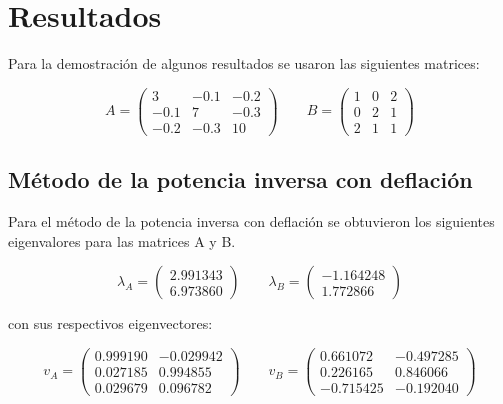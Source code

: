 \section{Resultados}

Para la demostración de algunos resultados se usaron las siguientes matrices:

\begin{equation}
    A = \begin{pmatrix}
        3    & -0.1 & -0.2 \\
        -0.1 & 7    & -0.3 \\
        -0.2 & -0.3 & 10
    \end{pmatrix}
    \qquad
    B = \begin{pmatrix}
        1 & 0 & 2 \\
        0 & 2 & 1 \\
        2 & 1 & 1
    \end{pmatrix}
\end{equation}
\subsection{Método de la potencia inversa con deflación}

Para el método de la potencia inversa con deflación se obtuvieron los siguientes eigenvalores para las matrices A y B.

\begin{equation*}
    \lambda_A = \begin{pmatrix}
        2.991343 \\
        6.973860
    \end{pmatrix}
    \qquad
    \lambda_B = \begin{pmatrix}
        -1.164248 \\
        1.772866
    \end{pmatrix}
\end{equation*}

con sus respectivos eigenvectores:

\begin{equation*}
    v_A = \begin{pmatrix}
        0.999190 & -0.029942 \\
        0.027185 & 0.994855  \\
        0.029679 & 0.096782
    \end{pmatrix}
    \qquad
    v_B = \begin{pmatrix}
        0.661072  & -0.497285 \\
        0.226165  & 0.846066  \\
        -0.715425 & -0.192040
    \end{pmatrix}
\end{equation*}


